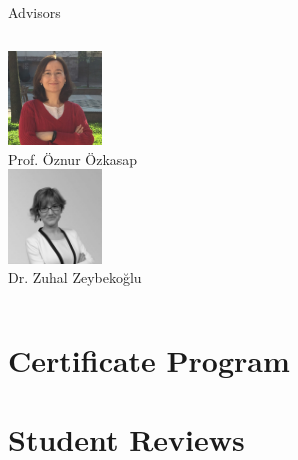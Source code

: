 \begin{frame}{Advisors}
\begin{columns}
        \column{3.333cm}
          \centering
          \includegraphics[width=2.5cm]{images/oozkasap.jpg}\\
          Prof. Öznur Özkasap\\
          \vspace{2.5mm}
          \includegraphics[width=2.5cm]{images/zzeybekoglu.jpg}\\
          Dr. Zuhal Zeybekoğlu\\
			\end{columns}
    
    \end{frame}

    \section{Certificate Program}

      \begin{frame}
        \frametitle{}
      
        
      
      \end{frame}



      \section{Student Reviews}

